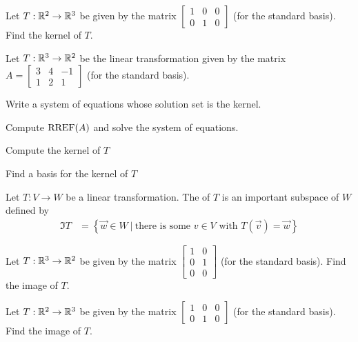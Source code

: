 \begin{applicationActivities}{2}{18}
\begin{activity}{5}
Let $T: \mathbb{R}^2 \rightarrow \mathbb{R}^3$ be given by the matrix $\begin{bmatrix} 1 & 0 &0  \\ 0 & 1 & 0 \end{bmatrix}$ (for the standard basis).  Find the kernel of $T$.
\end{activity}



\begin{activity}{10}
Let $T: \mathbb{R}^3 \rightarrow \mathbb{R}^2$ be the linear transformation given by the matrix $A=\begin{bmatrix} 3 & 4 & -1 \\ 1 & 2 & 1 \end{bmatrix}$ (for the standard basis).
\begin{subactivity}
Write a system of equations whose solution set is the kernel.
\end{subactivity}
\begin{subactivity}
Compute $\operatorname{RREF}(A)$ and solve the system of equations.
\end{subactivity}
\begin{subactivity}
Compute the kernel of $T$
\end{subactivity}
\begin{subactivity}
Find a basis for the kernel of $T$
\end{subactivity}
\end{activity}


\begin{definition}
Let $T: V \rightarrow W$ be a linear transformation.
The  of $T$ is an important subspace of \(W\) defined by
\begin{align*}
\Im T &= \left\{ \vec{w} \in W\ \big|\ \text{there is some }v\in V \text{ with } T(\vec{v})=\vec{w}\right\}
\end{align*}
\end{definition}

\begin{activity}{5}
Let $T: \mathbb{R}^3 \rightarrow \mathbb{R}^2$ be given by the matrix $\begin{bmatrix} 1 & 0 \\ 0 & 1 \\ 0 & 0 \end{bmatrix}$ (for the standard basis).  Find the image of $T$.
\end{activity}

\begin{activity}{5}
Let $T: \mathbb{R}^2 \rightarrow \mathbb{R}^3$ be given by the matrix $\begin{bmatrix} 1 & 0 &0  \\ 0 & 1 & 0 \end{bmatrix}$ (for the standard basis).  Find the image of $T$.
\end{activity}



\end{applicationActivities}
